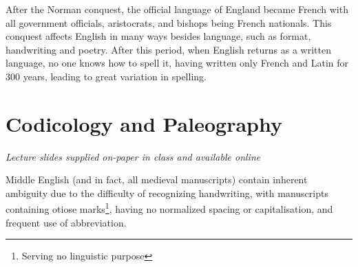 \documentclass[12pt]{report}
\begin{document}
After the Norman conquest, the official language of England became French with
all government officials, aristocrats, and bishops being French nationals. This
conquest affects English in many ways besides language, such as format,
handwriting and poetry. After this period, when English returns as a written
language, no one knows how to spell it, having written only French and Latin for
300 years, leading to great variation in spelling.

\chapter{Codicology and Paleography}

\textit{Lecture slides supplied on-paper in class and available online}

Middle English (and in fact, all medieval manuscripts) contain inherent
ambiguity due to the difficulty of recognizing handwriting, with manuscripts
containing otiose marks\footnote{Serving no linguistic purpose}, having no
normalized spacing or capitalisation, and frequent use of abbreviation.
\end{document}
